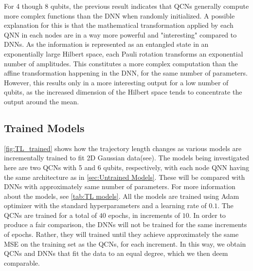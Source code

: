 For 4 though 8 qubits, the previous result indicates that QCNs generally compute more complex functions than the DNN when randomly initialized. A possible explanation for this is that the mathematical transformation applied by each QNN in each nodes are in a way more powerful and "interesting" compared to DNNs. As the information is represented as an entangled state in an exponentially large Hilbert space, each Pauli rotation transforms an exponential number of amplitudes. This constitutes a more complex computation than the affine transformation happening in the DNN, for the same number of parameters. However, this results only in a more interesting output for a low number of qubits, as the increased dimension of the Hilbert space tends to concentrate the output around the mean. 


\subsection{Trained Models}\label{sec:Trained Models}
\autoref{fig:TL_trained} shows how the trajectory length changes as various models are incrementally trained to fit 2D Gaussian data(see). The models being investigated here are two QCNs with 5 and 6 qubits, respectively, with each node QNN having the same architecture as in \autoref{sec:Untrained Models}. These will be compared with DNNs with approximately same number of parameters. For more information about the models, see \autoref{tab:TL models}. All the models are trained using Adam optimizer with the standard hyperparameters and a learning rate of $0.1$. The QCNs are trained for a total of $40$ epochs, in increments of $10$. In order to produce a fair comparison, the DNNs will not be trained for the same increments of epochs. Rather, they will trained until they achieve approximately the same MSE on the training set as the QCNs, for each increment. In this way, we obtain QCNs and DNNs that fit the data to an equal degree, which we then deem comparable. 

